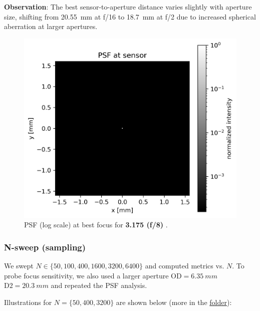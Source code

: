 \documentclass[11pt,a4paper]{article}
\begin{document}
	\textbf{Observation}: The best sensor-to-aperture distance varies slightly with aperture size, shifting from \SI{20.55}{mm} at f/16 to \SI{18.7}{mm} at f/2 due to increased spherical aberration at larger apertures.
	
	\begin{figure}[H]
		\centering
		\includegraphics[width=\linewidth]{biconvex_psf_log.png}
		\caption{PSF (log scale) at best focus for \textbf{3.175 (f/8)} .}
	\end{figure}
	
	\subsubsection*{N-sweep (sampling)}\label{n-sweep-sampling}
	
	We swept \(N \in \{50, 100, 400, 1600, 3200, 6400\}\) and computed metrics vs. \(N\).
	To probe focus sensitivity, we also used a larger aperture \(\mathrm{OD} = \SI{6.35}{mm}\) \(\mathrm{D2} = \SI{20.3}{mm}\) and repeated the PSF analysis.
	
	Illustrations for \(N=\{50, 400, 3200\}\) are shown below (more in the \href{../out/sweep_N}{folder}):
	
\end{document}
